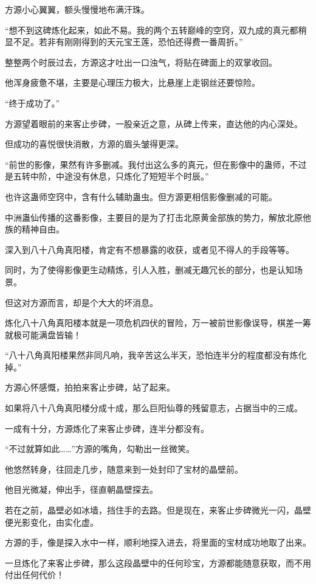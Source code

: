 \begin{this_body}
方源小心翼翼，额头慢慢地布满汗珠。

“想不到这碑炼化起来，如此不易。我的两个五转巅峰的空窍，双九成的真元都稍显不足。若非有刚刚得到的天元宝王莲，恐怕还得费一番周折。”

整整两个时辰过去，方源这才吐出一口浊气，将贴在碑面上的双掌收回。

他浑身疲惫不堪，主要是心理压力极大，比悬崖上走钢丝还要惊险。

“终于成功了。”

方源望着眼前的来客止步碑，一股亲近之意，从碑上传来，直达他的内心深处。

但成功的喜悦很快消散，方源的眉头皱得更深。

“前世的影像，果然有许多删减。我付出这么多的真元，但在影像中的蛊师，不过是五转中阶，中途没有休息，只炼化了短短半个时辰。”

也许这蛊师空窍中，含有什么辅助蛊虫。但方源更相信影像删减的可能。

中洲蛊仙传播的这番影像，主要目的是为了打击北原黄金部族的势力，解放北原他族的精神自由。

深入到八十八角真阳楼，肯定有不想暴露的收获，或者见不得人的手段等等。

同时，为了使得影像更生动精炼，引人入胜，删减无趣冗长的部分，也是认知场景。

但这对方源而言，却是个大大的坏消息。

炼化八十八角真阳楼本就是一项危机四伏的冒险，万一被前世影像误导，棋差一筹就极可能满盘皆输！

“八十八角真阳楼果然非同凡响，我辛苦这么半天，恐怕连半分的程度都没有炼化掉。”

方源心怀感慨，拍拍来客止步碑，站了起来。

如果将八十八角真阳楼分成十成，那么巨阳仙尊的残留意志，占据当中的三成。

一成有十分，方源炼化了来客止步碑，连半分都没有。

“不过就算如此……”方源的嘴角，勾勒出一丝微笑。

他悠然转身，往回走几步，随意来到一处封印了宝材的晶壁前。

他目光微凝，伸出手，径直朝晶壁探去。

若在之前，晶壁必如冰墙，挡住手的去路。但是现在，来客止步碑微光一闪，晶壁便光影变化，由实化虚。

方源的手，像是探入水中一样，顺利地探入进去，将里面的宝材成功地取了出来。

一旦炼化了来客止步碑，那么这段晶壁中的任何珍宝，方源都能随意获取，而不用付出任何代价！


\end{this_body}
